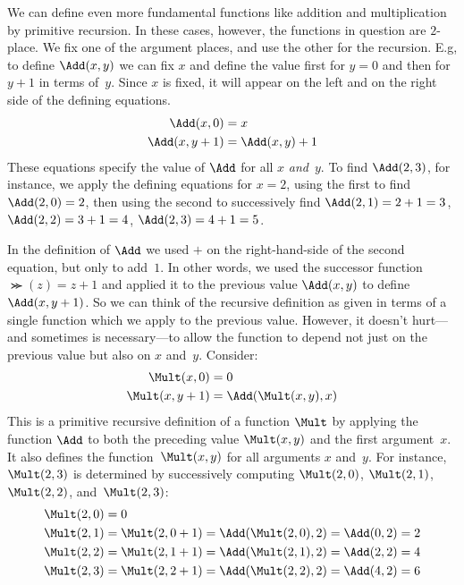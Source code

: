 \documentclass[../../../include/open-logic-section]{subfiles}
\begin{document}
We can define even more fundamental functions like addition and
multiplication by primitive recursion. In these cases, however, the
functions in question are $2$-place. We fix one of the argument
places, and use the other for the recursion. E.g, to define
$\Add(x, y)$ we can fix $x$ and define the value first for $y=0$
and then for $y+1$ in terms of~$y$. Since $x$ is fixed, it will appear
on the left and on the right side of the defining equations.
\begin{align*}
\Add(x,0) & =  x\\
\Add(x,y+1) & =  \Add(x,y)+1
\end{align*}
These equations specify the value of $\Add$ for all $x$
\emph{and}~$y$. To find $\Add(2,3)$, for instance, we apply the
defining equations for $x = 2$, using the first to find
$\Add(2,0) = 2$, then using the second to successively find
$\Add(2,1) = 2 + 1 = 3$, $\Add(2, 2) = 3 + 1 = 4$, $\Add(2,
3) = 4 + 1 = 5$.

In the definition of $\Add$ we used $+$ on the right-hand-side of
the second equation, but only to add~$1$. In other words, we used the
successor function $\Succ(z) = z+1$ and applied it to the previous value
$\Add(x,y)$ to define $\Add(x,y+1)$. So we can think of the
recursive definition as given in terms of a single function which we
apply to the previous value. However, it doesn't hurt---and sometimes
is necessary---to allow the function to depend not just on the previous
value but also on $x$ and~$y$. Consider:
\begin{align*}
  \Mult(x,0) & =  0 \\
  \Mult(x,y+1) & =  \Add(\Mult(x,y),x)
\end{align*}
This is a primitive recursive definition of a function $\Mult$ by
applying the function $\Add$ to both the preceding value
$\Mult(x,y)$ and the first argument~$x$. It also defines the
function~$\Mult(x,y)$ for all arguments $x$ and~$y$. For instance,
$\Mult(2,3)$ is determined by successively computing $\Mult(2,0)$,
$\Mult(2,1)$, $\Mult(2,2)$, and~$\Mult(2,3)$:
\begin{align*}
  \Mult(2,0) & = 0\\
  \Mult(2,1) & = \Mult(2,0+1) =
  \Add(\Mult(2,0), 2) = \Add(0, 2) = 2\\
  \Mult(2,2) & = \Mult(2,1+1) =
  \Add(\Mult(2,1), 2) = \Add(2, 2) = 4\\
  \Mult(2,3) & = \Mult(2,2+1) =
  \Add(\Mult(2,2), 2) = \Add(4, 2) = 6
\end{align*}
\end{document}
